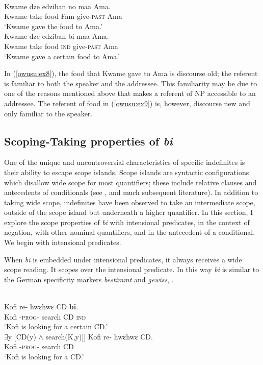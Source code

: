 \documentclass[output=paper,modfonts,nonflat,draftmode]{langsci/langscibook}
\begin{document}
\ea {}\\
\ea\label{owusu:ex8}
\gll  Kwame dze edziban no maa Ama.\\
   Kwame take food Fam give-\textsc{past} Ama \\ 
\glt `Kwame gave the food to Ama.'\\

\ex\label{owusu:ex9} 
\gll Kwame dze edziban bi maa Ama.\\
   Kwame take food \textsc{ind} give-\textsc{past} Ama \\ 
\glt `Kwame gave a certain food to Ama.'\\
\z \z 

In (\ref{owusu:ex8}), the food that Kwame gave to Ama is discourse old; the referent is familiar to both the speaker and the addressee. This familiarity may be due to one of the reasons mentioned above that makes a referent of NP accessible to an addressee. The referent of food in (\ref{owusu:ex9}) is, however, discourse new and only familiar to the speaker.
	 
\subsection{Scoping-Taking properties of \emph{bi}}
One of the unique and uncontroversial characteristics of specific indefinites is their ability to escape scope islands. Scope islands are syntactic configurations which disallow wide scope for most quantifiers; these include relative clauses and antecedents of conditionals (see \citealt{FodorSag1982}, and much subsequent literature). In addition to taking wide scope, indefinites have been observed to take an intermediate scope, outside of the scope island but underneath a higher quantifier. In this section, I explore the scope properties of \emph{bi} with intensional predicates, in the context of negation, with other nominal quantifiers, and in the antecedent of a conditional. We begin with intensional predicates.

   When \emph{bi} is embedded under intensional predicates, it always receives a wide scope reading. It scopes over the intensional predicate. In this way \emph{bi} is similar to the German specificity markers \emph{bestimmt} and \emph{gewiss}, \citep{EbertEtAl2012}.
   
 \ea 
 \\
 \ea \label{006}
\gll Kofi re- hwεhwε CD \textbf{bi}.\\
    Kofi -\textsc{prog}-  search CD \textsc{ind}\\
\glt `Kofi is looking for a certain CD.'\\
$\exists$y [CD(y) $\wedge$ search(K,y)]]
\ex\label{006b}
\gll Kofi re- hwεhwε CD.\\
 Kofi -\textsc{prog}-  search CD  \\
\glt `Kofi is looking for a CD.'
\z \z 
\end{document}
